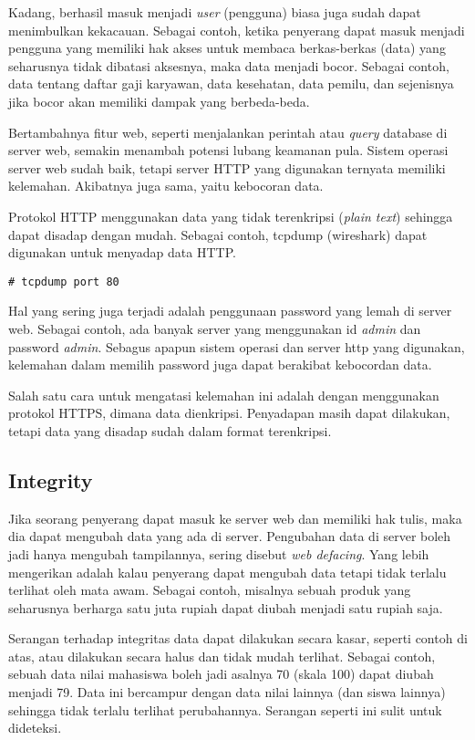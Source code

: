 Kadang, berhasil masuk menjadi {\em user} (pengguna) biasa juga sudah dapat
menimbulkan kekacauan. Sebagai contoh, ketika penyerang dapat masuk menjadi
pengguna yang memiliki hak akses untuk membaca berkas-berkas (data) yang
seharusnya tidak dibatasi aksesnya, maka data menjadi bocor. Sebagai contoh,
data tentang daftar gaji karyawan, data kesehatan, data pemilu, dan sejenisnya
jika bocor akan memiliki dampak yang berbeda-beda.

Bertambahnya fitur web, seperti menjalankan perintah atau {\em query} database
di server web, semakin menambah potensi lubang keamanan pula. Sistem operasi
server web sudah baik, tetapi server HTTP yang digunakan ternyata memiliki
kelemahan. Akibatnya juga sama, yaitu kebocoran data.

Protokol HTTP menggunakan data yang tidak terenkripsi ({\em plain text})
sehingga dapat disadap dengan mudah. Sebagai contoh, tcpdump (wireshark) dapat
digunakan untuk menyadap data HTTP.

\begin{verbatim}
# tcpdump port 80
\end{verbatim}


Hal yang sering juga terjadi adalah penggunaan password yang lemah di server
web. Sebagai contoh, ada banyak server yang menggunakan id {\em admin} dan
password {\em admin}. Sebagus apapun sistem operasi dan server http yang
digunakan, kelemahan dalam memilih password juga dapat berakibat kebocordan
data.

Salah satu cara untuk mengatasi kelemahan ini adalah dengan menggunakan
protokol HTTPS, dimana data dienkripsi. Penyadapan masih dapat dilakukan,
tetapi data yang disadap sudah dalam format terenkripsi.

\subsection{Integrity}
Jika seorang penyerang dapat masuk ke server web dan memiliki hak tulis, maka
dia dapat mengubah data yang ada di server. Pengubahan data di server boleh
jadi hanya mengubah tampilannya, sering disebut {\em web defacing}. Yang lebih
mengerikan adalah kalau penyerang dapat mengubah data tetapi tidak terlalu
terlihat oleh mata awam. Sebagai contoh, misalnya sebuah produk yang seharusnya
berharga satu juta rupiah dapat diubah menjadi satu rupiah saja.

Serangan terhadap integritas data dapat dilakukan secara kasar, seperti contoh
di atas, atau dilakukan secara halus dan tidak mudah terlihat. Sebagai contoh,
sebuah data nilai mahasiswa boleh jadi asalnya 70 (skala 100) dapat diubah 
menjadi 79. Data ini bercampur dengan data nilai lainnya (dan siswa lainnya)
sehingga tidak terlalu terlihat perubahannya. Serangan seperti ini sulit untuk
dideteksi.


